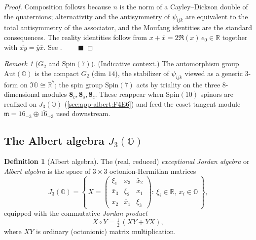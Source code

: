 \documentclass[11pt]{article}
\theoremstyle{plain}
\theoremstyle{definition}
\newtheorem{definition}[theorem]{Definition}
\theoremstyle{remark}
\newtheorem{remark}[theorem]{Remark}
\begin{document}
\begin{proof}
Composition follows because $n$ is the norm of a Cayley--Dickson double of the
quaternions; alternativity and the antisymmetry of $\psi_{ijk}$ are equivalent to
the total antisymmetry of the associator, and the Moufang identities are the
standard consequences. The reality identities follow from
$x+\bar x=2\Re(x)\,e_0\in\mathbb R$ together with $\overline{xy}=\bar y\bar x$.
See \cite{Baez:2002,Schafer:1966}. $\qquad\blacksquare$
\end{proof}

\begin{remark}[$G_2$ and $\mathrm{Spin}(7)$]\label{rmk:app-albert:g2}
\textup{(Indicative context.)}
The automorphism group $\mathrm{Aut}(\mathbb O)$ is the compact $G_2$ (dim $14$),
the stabilizer of $\psi_{ijk}$ viewed as a generic $3$-form on $\Im\mathbb O\cong
\mathbb R^7$; the spin group $\mathrm{Spin}(7)$ acts by triality on the three
$8$-dimensional modules $\mathbf 8_v,\mathbf 8_s,\mathbf 8_c$. These reappear when
$\mathrm{Spin}(10)$ spinors are realized on $J_3(\mathbb O)$
(\autoref{sec:app-albert:F4E6}) and feed the coset tangent module
$\mathfrak m=16_{-3}\oplus\overline{16}_{+3}$ used downstream.
\end{remark}

\subsection{The Albert algebra \texorpdfstring{$J_3(\mathbb O)$}{J3(O)}}
\label{sec:app-albert:jalg}

\begin{definition}[Albert algebra]\label{def:app-albert:jalg}
The (real, reduced) \emph{exceptional Jordan algebra} or \emph{Albert algebra} is
the space of $3\times3$ octonion-Hermitian matrices
\begin{equation}\label{eq:app-albert:Xform}
  J_3(\mathbb O)=
  \left\{\,
  X=\begin{pmatrix}
      \xi_1 & x_3 & \bar x_2\\
      \bar x_3 & \xi_2 & x_1\\
      x_2 & \bar x_1 & \xi_3
    \end{pmatrix}
  :\ \xi_i\in\mathbb R,\ x_i\in\mathbb O
  \,\right\},
\end{equation}
equipped with the commutative \emph{Jordan product}
\begin{equation}\label{eq:app-albert:jprod}
  X\circ Y=\tfrac12\,(XY+YX),
\end{equation}
where $XY$ is ordinary (octonionic) matrix multiplication.
\end{definition}
\end{document}
